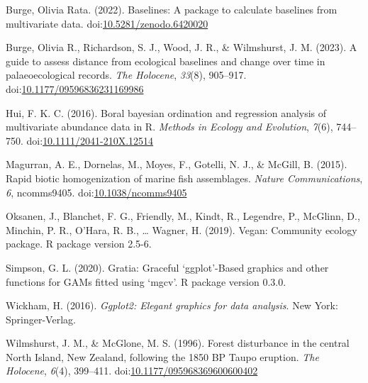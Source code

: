 \documentclass[nofonts,]{tufte-handout}
\newlength{\cslhangindent}
\newenvironment{CSLReferences}[2]%
  {\setlength{\parindent}{0pt}%
  \everypar{\setlength{\hangindent}{\cslhangindent}}\ignorespaces}%
  {\par}
\begin{document}
\hypertarget{refs}{}
\begin{CSLReferences}{0}{5}
\leavevmode{}%
Burge, Olivia Rata. (2022). Baselines: {A} package to calculate
baselines from multivariate data.
doi:\href{https://doi.org/10.5281/zenodo.6420020}{10.5281/zenodo.6420020}

\leavevmode{}%
Burge, Olivia R., Richardson, S. J., Wood, J. R., \& Wilmshurst, J. M.
(2023). A guide to assess distance from ecological baselines and change
over time in palaeoecological records. \emph{The Holocene},
\emph{33}(8), 905--917.
doi:\href{https://doi.org/10.1177/09596836231169986}{10.1177/09596836231169986}

\leavevmode{}%
Hui, F. K. C. (2016). Boral \textendash{} bayesian ordination and
regression analysis of multivariate abundance data in {R}. \emph{Methods
in Ecology and Evolution}, \emph{7}(6), 744--750.
doi:\href{https://doi.org/10.1111/2041-210X.12514}{10.1111/2041-210X.12514}

\leavevmode{}%
Magurran, A. E., Dornelas, M., Moyes, F., Gotelli, N. J., \& McGill, B.
(2015). Rapid biotic homogenization of marine fish assemblages.
\emph{Nature Communications}, \emph{6}, ncomms9405.
doi:\href{https://doi.org/10.1038/ncomms9405}{10.1038/ncomms9405}

\leavevmode{}%
Oksanen, J., Blanchet, F. G., Friendly, M., Kindt, R., Legendre, P.,
McGlinn, D., Minchin, P. R., O'Hara, R. B., \ldots{} Wagner, H. (2019).
Vegan: {Community} ecology package. {R} package version 2.5-6.

\leavevmode{}%
Simpson, G. L. (2020). Gratia: Graceful {`ggplot'}-{Based} graphics and
other functions for {GAMs} fitted using {`mgcv'}. {R} package version
0.3.0.

\leavevmode{}%
Wickham, H. (2016). \emph{Ggplot2: Elegant graphics for data analysis}.
{New York}: {Springer-Verlag}.

\leavevmode{}%
Wilmshurst, J. M., \& McGlone, M. S. (1996). Forest disturbance in the
central {North Island}, {New Zealand}, following the 1850 {BP Taupo}
eruption. \emph{The Holocene}, \emph{6}(4), 399--411.
doi:\href{https://doi.org/10.1177/095968369600600402}{10.1177/095968369600600402}

\end{CSLReferences}
\end{document}
